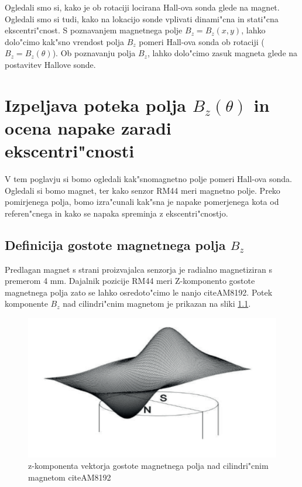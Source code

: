 Ogledali smo si, kako je ob rotaciji locirana Hall-ova sonda glede na magnet. Ogledali smo si tudi, kako na lokacijo sonde vplivati dinami"cna in stati"cna ekscentri"cnost. S poznavanjem magnetnega polje $B_z=B_z(x , y)$, lahko dolo"cimo kak"sno vrendost polja $B_z$ pomeri Hall-ova sonda ob rotaciji ($B_z=B_z(\theta)$). Ob poznavanju polja $B_z$, lahko dolo"cimo zasuk magneta glede na postavitev Hallove sonde.


\chapter{Izpeljava poteka polja $B_z(\theta)$ in ocena napake zaradi ekscentri"cnosti}

V tem poglavju si bomo ogledali kak"snomagnetno polje  pomeri Hall-ova sonda. Ogledali si bomo magnet, ter kako senzor RM44 meri magnetno polje. Preko pomirjenega polja, bomo izra"cunali kak"sna je napake pomerjenega kota od referen"cnega in kako se napaka spreminja z ekscentri"cnostjo.

\section{Definicija  gostote magnetnega polja $B_z$}

Predlagan magnet s strani proizvajalca senzorja je radialno magnetiziran s premerom 4 mm.
Dajalnik pozicije RM44 meri Z-komponento gostote magnetnega polja zato se lahko osredoto"cimo le nanjo citeAM8192. Potek komponente $B_z$ nad cilindri"cnim magnetom je prikazan na sliki \ref{fig:magnetno_polje}.




\begin{figure}[h]
	\centering
		\includegraphics[width=0.75\columnwidth]{./Slike/magnetno_polje.jpg}
	\caption{z-komponenta vektorja gostote magnetnega polja nad cilindri"cnim magnetom citeAM8192}
	\label{fig:magnetno_polje}
\end{figure}


